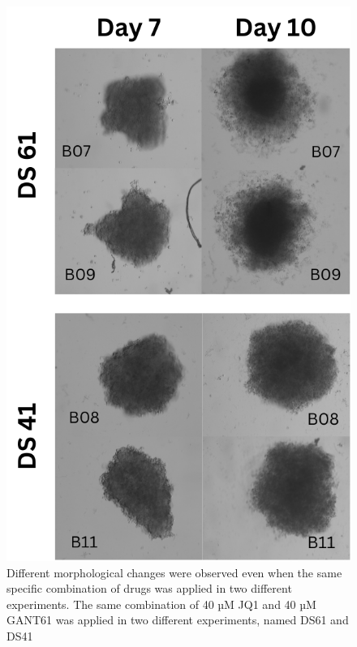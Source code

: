 \begin{figure}[H]
  \centering
  \includegraphics[scale=0.3]{figures/drug_eff.png} 
  \caption{Different morphological changes were observed even when the same specific combination of drugs was applied in two different experiments. The same combination of 40 µM JQ1 and 40 µM GANT61 was applied in two different experiments, named DS61 and DS41}
  \label{fig:drug_eff}
\end{figure}


